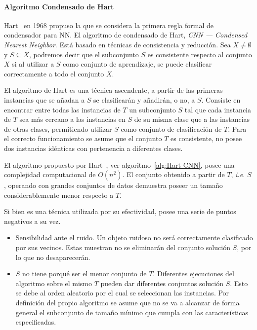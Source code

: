 \paragraph{Algoritmo Condensado de Hart}\label{paragraph:CNN}
\hfill \break
Hart~\cite{hart1968condensed} en 1968 propuso la que se considera la primera regla formal de condensador para NN. El algoritmo de condensado de Hart, \textit{CNN --- Condensed Nearest Neighbor}. Está basado en técnicas de consistencia y reducción. Sea $X \not= \emptyset$ y $S \subseteq X$, podremos decir que el subconjunto $S$ es consistente respecto al conjunto $X$ si al utilizar a $S$ como conjunto de aprendizaje, se puede clasificar correctamente a todo el conjunto $X$.

El algoritmo de Hart es una técnica ascendente, a partir de las primeras instancias que se añadan a $S$ se clasificarán y añadirán, o no, a $S$. Consiste en encontrar entre todas las instancias de $T$ un subconjunto $S$ tal que cada instancia de $T$ sea más cercano a las instancias en $S$ de su misma clase que a las instancias de otras clases, permitiendo utilizar $S$ como conjunto de clasificación de $T$. Para el correcto funcionamiento se asume que el conjunto $T$ es consistente, no posee dos instancias idénticas con pertenencia a diferentes clases.

El algoritmo propuesto por Hart~\cite{hart1968condensed}, ver algoritmo~\ref{alg:Hart-CNN}, posee una complejidad computacional de $O(n^2)$. El conjunto obtenido a partir de $T$, \textit{i.e.} $S$, operando con grandes conjuntos de datos demuestra poseer un tamaño considerablemente menor respecto a $T$. 

Si bien es una técnica utilizada por su efectividad, posee una serie de puntos negativos a su vez.
\begin{itemize}
\item Sensibilidad ante el ruido. Un objeto ruidoso no será correctamente clasificado por sus vecinos. Estas muestran no se eliminarán del conjunto solución $S$, por lo que no desaparecerán.
\item $S$ no tiene porqué ser el menor conjunto de $T$. Diferentes ejecuciones del algoritmo sobre el mismo $T$ pueden dar diferentes conjuntos solución $S$. Esto se debe al orden aleatorio por el cual se seleccionan las instancias. Por definición del propio algoritmo se asume que no se va a alcanzar de forma general el subconjunto de tamaño mínimo que cumpla con las características especificadas.
\end{itemize}

